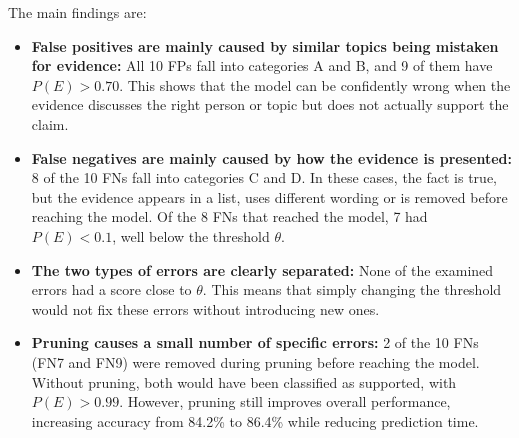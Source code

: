 \documentclass[12pt,a4paper]{article}
\begin{document}
\noindent The main findings are:
\begin{itemize}
\item \textbf{False positives are mainly caused by similar topics being mistaken for evidence:} All 10 FPs fall into categories A and B, and 9 of them have $P(E) > 0.70$. This shows that the model can be confidently wrong when the evidence discusses the right person or topic but does not actually support the claim.

\item \textbf{False negatives are mainly caused by how the evidence is presented:} 8 of the 10 FNs fall into categories C and D. In these cases, the fact is true, but the evidence appears in a list, uses different wording or is removed before reaching the model. Of the 8 FNs that reached the model, 7 had $P(E) < 0.1$, well below the threshold $\theta$.

\item \textbf{The two types of errors are clearly separated:} None of the examined errors had a score close to $\theta$. This means that simply changing the threshold would not fix these errors without introducing new ones.

\item \textbf{Pruning causes a small number of specific errors:} 2 of the 10 FNs (FN7 and FN9) were removed during pruning before reaching the model. Without pruning, both would have been classified as supported, with $P(E) > 0.99$. However, pruning still improves overall performance, increasing accuracy from 84.2\% to 86.4\% while reducing prediction time.
\end{itemize}
\end{document}
